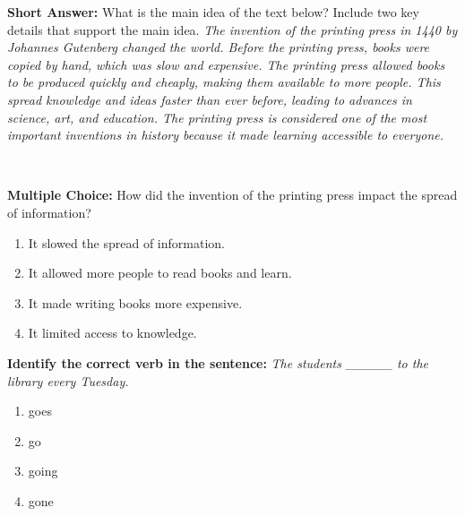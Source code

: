 \documentclass[12pt]{article}
\begin{document}
\begin{tcolorbox}[colframe=black!50, colback=white, title=Question 6]
\textbf{Short Answer:} What is the main idea of the text below? Include two key details that support the main idea.  
\textit{The invention of the printing press in 1440 by Johannes Gutenberg changed the world. Before the printing press, books were copied by hand, which was slow and expensive. The printing press allowed books to be produced quickly and cheaply, making them available to more people. This spread knowledge and ideas faster than ever before, leading to advances in science, art, and education. The printing press is considered one of the most important inventions in history because it made learning accessible to everyone.}

\vspace{2em}
 \underline{\hspace{15.8cm}}  
    \\[0.8cm] \underline{\hspace{15.8cm}}  
\end{tcolorbox}

\begin{tcolorbox}[colframe=black!50, colback=white, title=Question 7]
\textbf{Multiple Choice:} How did the invention of the printing press impact the spread of information?  
\begin{enumerate}[label=(\Alph*)]
\item It slowed the spread of information.
\item It allowed more people to read books and learn.
\item It made writing books more expensive.
\item It limited access to knowledge.
\end{enumerate}
\end{tcolorbox}

\begin{tcolorbox}[colframe=black!50, colback=white, title=Question 8]
\textbf{Identify the correct verb in the sentence:}  
\textit{The students \_\_\_\_\_ to the library every Tuesday.}  
\begin{enumerate}[label=(\Alph*)]
\item goes
\item go
\item going
\item gone
\end{enumerate}
\end{tcolorbox}
\end{document}
